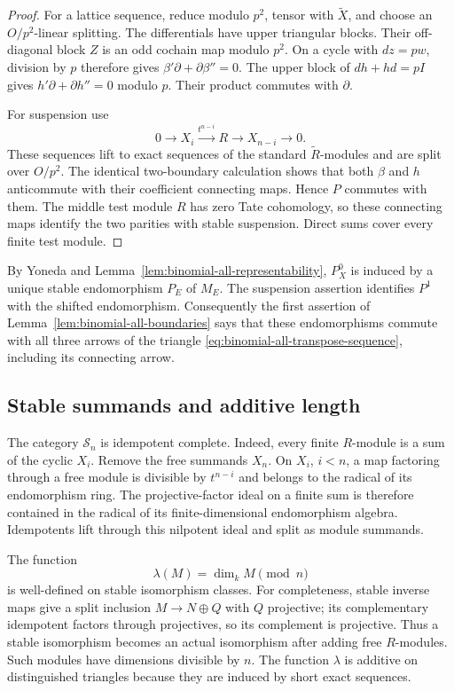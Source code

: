 \begin{proof}
For a lattice sequence, reduce modulo $p^2$, tensor with
$\widetilde X$, and choose an $O/p^2$-linear splitting.
The differentials have upper triangular blocks.  Their
off-diagonal block $Z$ is an odd cochain map modulo $p^2$.
On a cycle with $dz=pw$, division by $p$ therefore gives
$\beta'\partial+\partial\beta''=0$.
The upper block of $dh+hd=pI$ gives
$h'\partial+\partial h''=0$ modulo $p$.
Their product commutes with $\partial$.

For suspension use
\[
 0\longrightarrow X_i\xrightarrow{t^{n-i}}R
 \longrightarrow X_{n-i}\longrightarrow0.
\]
These sequences lift to exact sequences of the standard
$\widetilde R$-modules and are split over $O/p^2$.
The identical two-boundary calculation shows that both
$\beta$ and $h$ anticommute with their coefficient connecting
maps.  Hence $P$ commutes with them.  The middle test module
$R$ has zero Tate cohomology, so these connecting maps
identify the two parities with stable suspension.
Direct sums cover every finite test module.
\end{proof}

By Yoneda and Lemma~\ref{lem:binomial-all-representability},
$P^0_X$ is induced by a unique stable endomorphism
$P_E$ of $M_E$.  The suspension assertion identifies $P^1$
with the shifted endomorphism.  Consequently the first
assertion of Lemma~\ref{lem:binomial-all-boundaries} says that
these endomorphisms commute with all three arrows of the
triangle \eqref{eq:binomial-all-transpose-sequence},
including its connecting arrow.

\subsection{Stable summands and additive length}

The category $\mathcal S_n$ is idempotent complete.
Indeed, every finite $R$-module is a sum of the cyclic
$X_i$.  Remove the free summands $X_n$.
On $X_i$, $i<n$, a map factoring through a free module is
divisible by $t^{n-i}$ and belongs to the radical of its
endomorphism ring.  The projective-factor ideal on a finite
sum is therefore contained in the radical of its finite-dimensional
endomorphism algebra.  Idempotents lift through this nilpotent
ideal and split as module summands.

The function
\[
 \lambda(M)=\dim_k M\pmod n
\]
is well-defined on stable isomorphism classes.
For completeness, stable inverse maps give a split inclusion
$M\to N\oplus Q$ with $Q$ projective; its complementary
idempotent factors through projectives, so its complement
is projective.  Thus a stable isomorphism becomes an actual
isomorphism after adding free $R$-modules.  Such modules
have dimensions divisible by $n$.
The function $\lambda$ is additive on distinguished triangles
because they are induced by short exact sequences.

